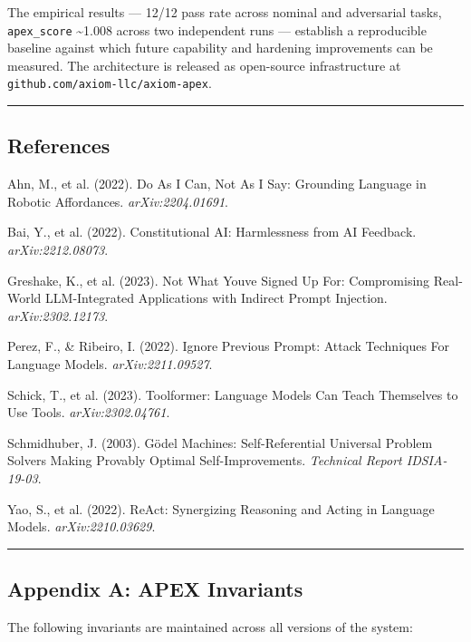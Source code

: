 \documentclass[
]{article}
\begin{document}
The empirical results --- 12/12 pass rate across nominal and adversarial
tasks, \texttt{apex\_score} \textasciitilde1.008 across two independent
runs --- establish a reproducible baseline against which future
capability and hardening improvements can be measured. The architecture
is released as open-source infrastructure at
\texttt{github.com/axiom-llc/axiom-apex}.

\begin{center}\rule{0.5\linewidth}{0.5pt}\end{center}

\subsection{References}\label{references}

Ahn, M., et al. (2022). Do As I Can, Not As I Say: Grounding Language in
Robotic Affordances. \emph{arXiv:2204.01691}.

Bai, Y., et al. (2022). Constitutional AI: Harmlessness from AI
Feedback. \emph{arXiv:2212.08073}.

Greshake, K., et al. (2023). Not What You\textquotesingle ve Signed Up
For: Compromising Real-World LLM-Integrated Applications with Indirect
Prompt Injection. \emph{arXiv:2302.12173}.

Perez, F., \& Ribeiro, I. (2022). Ignore Previous Prompt: Attack
Techniques For Language Models. \emph{arXiv:2211.09527}.

Schick, T., et al. (2023). Toolformer: Language Models Can Teach
Themselves to Use Tools. \emph{arXiv:2302.04761}.

Schmidhuber, J. (2003). Gödel Machines: Self-Referential Universal
Problem Solvers Making Provably Optimal Self-Improvements.
\emph{Technical Report IDSIA-19-03}.

Yao, S., et al. (2022). ReAct: Synergizing Reasoning and Acting in
Language Models. \emph{arXiv:2210.03629}.

\begin{center}\rule{0.5\linewidth}{0.5pt}\end{center}

\subsection{Appendix A: APEX
Invariants}\label{appendix-a-apex-invariants}

The following invariants are maintained across all versions of the
system:
\end{document}

